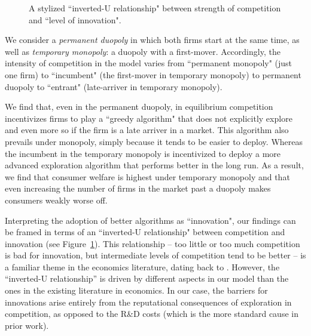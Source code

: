 \documentclass[../competing_bandits_with_appendix.tex]{subfiles}
\begin{document}
\begin{figure}
\begin{center}
 \caption{A stylized ``inverted-U relationship" between strength of competition and ``level of innovation".}
\label{fig:inverted-U}
\end{center}
\end{figure}


We consider a \emph{permanent duopoly} in which both firms start at the same time, as well as \emph{temporary monopoly}: a duopoly with a first-mover. Accordingly, the intensity of competition in the model varies from ``permanent monopoly" (just one firm) to ``incumbent" (the first-mover in temporary monopoly) to permanent duopoly to ``entrant" (late-arriver in temporary monopoly). 


We find that, even in the permanent duopoly, in equilibrium competition incentivizes firms to play a ``greedy algorithm" that does not explicitly explore and even more so if the firm is a late arriver in a market. This algorithm also prevails under monopoly, simply because it tends to be easier to deploy. Whereas the incumbent in the temporary monopoly is incentivized to deploy a more advanced exploration algorithm that performs better in the long run. As a result, we find that consumer welfare is highest under temporary monopoly and that even increasing the number of firms in the market past a duopoly makes consumers weakly worse off.

Interpreting the adoption of better algorithms as ``innovation", our findings can be framed in terms of an ``inverted-U relationship" between competition and innovation (see Figure~\ref{fig:inverted-U}). This relationship -- too little or too much competition is bad for innovation, but intermediate levels of competition tend to be better -- is a familiar theme in the economics literature, dating back to \cite{Schumpeter-42}. However, the ``inverted-U relationship'' is driven by different aspects in our model than the ones in the existing literature in economics. In our case, the barriers for innovations arise entirely from the reputational consequences of exploration in competition, as opposed to the R\&D costs (which is the more standard cause in prior work).
\end{document}
